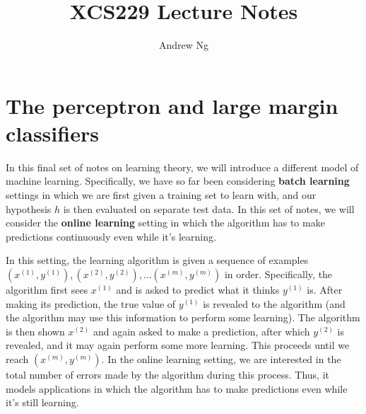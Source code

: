 \documentclass{article}
\begin{document}
\title{XCS229 Lecture Notes}
\author{Andrew Ng}
\date{}
\maketitle


\noindent

\def\qed {\hfill\hbox{{\vspace{0.01in} \large $\Box$}}}



\section{The perceptron and large margin classifiers}

%

In this final set of notes on learning theory, we will introduce
a different model of machine learning.  Specifically, we have so
far been considering {\bf batch learning} settings in which we are
first given a training set to learn with, and our hypothesis $h$ 
is then evaluated on separate test data.  In this set of notes, we will 
consider the {\bf online learning} setting in which the algorithm
has to make predictions continuously even while it's learning.

In this setting, the learning algorithm 
is given a sequence of examples 
$(x^{(1)}, y^{(1)}), (x^{(2)}, y^{(2)}),  \ldots (x^{(m)}, y^{(m)})$ 
in order.  
Specifically, the algorithm first sees $x^{(1)}$ and is asked to predict 
what it thinks $y^{(1)}$ is. 
After making its prediction, the true value of $y^{(1)}$ is revealed 
to the algorithm (and the algorithm may use this information to perform
some learning).  The algorithm is then shown $x^{(2)}$ and
again asked to make a prediction, after which $y^{(2)}$ is revealed, 
and it may again 
perform some more learning.  This proceeds until we reach $(x^{(m)}, y^{(m)})$.  
In the online learning setting, we are interested in the total number of 
errors made by the algorithm during this process.  Thus, it models 
applications in which the algorithm has to make predictions even while it's
still learning. 
\end{document}
